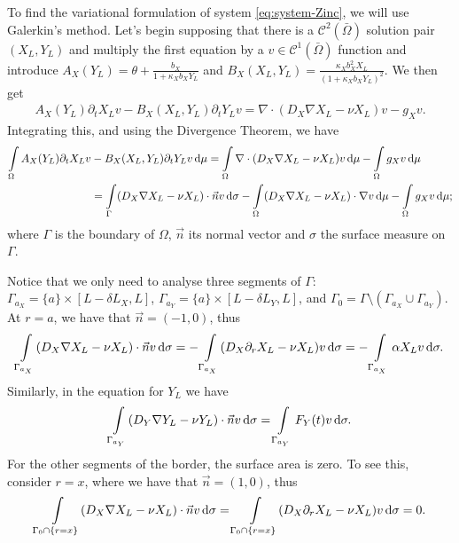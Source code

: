 \documentclass[a4paper,doc,11pt]{article}
\begin{document}
To find the variational formulation of system \eqref{eq:system-Zinc}, we will use Galerkin's method. Let's begin supposing that there is a $\mathcal{C}^2 (\bar \Omega)$ solution pair $(X_L,Y_L)$ and multiply the first equation by a $v \in \mathcal{C}^1 (\bar\Omega)$ function and introduce $A_X(Y_L) = \theta + \frac{b_X}{1 + \kappa_X b_X Y_L}$ and $B_X(X_L,Y_L) = \frac{\kappa_X b_X^2 X_L}{(1+\kappa_X b_X Y_L)^2}$. We then get
\begin{align}
    A_X(Y_L) \partial_t X_L v - B_X(X_L,Y_L) \partial_t Y_L v = \nabla \cdot (D_X \nabla X_L - \nu X_L) v - g_X v.
\end{align}
Integrating this, and using the Divergence Theorem, we have
\begin{align}
    \int\limits_\Omega
    A_X(Y_L) \partial_t X_L v &- B_X(X_L,Y_L) \partial_t Y_L v \dif \mu = 
    \int\limits_\Omega
    \nabla \cdot (D_X \nabla X_L - \nu X_L) v  \dif \mu
    -\int\limits_\Omega g_X v \dif \mu
    \\
    &=
    \int\limits_\Gamma
    (D_X \nabla X_L - \nu X_L) \cdot \vec{n} v
    \dif \sigma
    -\int\limits_\Omega
    (D_X \nabla X_L - \nu X_L) \cdot \nabla v  \dif \mu
    -\int\limits_\Omega g_X v \dif \mu;
\end{align}
where $\Gamma$ is the boundary of $\Omega$, $\vec{n}$ its normal vector and $\sigma$ the surface measure on $\Gamma$. 

Notice that we only need to analyse three segments of $\Gamma$: $\Gamma_{a_X} = \{a\}\times [L-\delta L_X,L]$, $\Gamma_{a_Y} = \{a\} \times [L - \delta L_Y, L]$, and $ \Gamma_0 = \Gamma \setminus (\Gamma_{a_X} \cup \Gamma_{a_Y})$. At $r = a$, we have that $ \vec{n} = (-1,0)$, thus
\begin{align}
    \int\limits_{\Gamma_{a_X}}
    (D_X \nabla X_L - \nu X_L) \cdot \vec{n} v    \dif \sigma
    =
    -
    \int\limits_{\Gamma_{a_X}}
    (D_X \partial_r X_L - \nu X_L) v    \dif \sigma
    =
    -\int\limits_{\Gamma_{a_X}}
    \alpha X_L v    \dif \sigma.
\end{align}
Similarly, in the equation for \(Y_L\) we have
\begin{align}
    \int\limits_{\Gamma_{a_Y}}
    (D_Y \nabla Y_L - \nu Y_L) \cdot \vec{n} v    \dif \sigma
    =
    \int\limits_{\Gamma_{a_Y}}
    F_Y(t) v    \dif \sigma.
\end{align}
For the other segments of the border, the surface area is zero. To see this, consider $r = x$, where we have that $ \vec{n} = (1,0)$, thus
\begin{align}
    \int\limits_{\Gamma_0 \cap \{r=x\}}
    (D_X \nabla X_L - \nu X_L) \cdot \vec{n} v    \dif \sigma
    =
    \int\limits_{\Gamma_0 \cap \{r=x\}}
    (D_X \partial_r X_L - \nu X_L) v    \dif \sigma
    =
    0.
\end{align}
\end{document}
